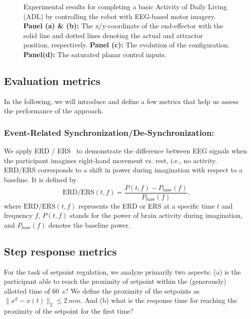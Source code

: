 \begin{figure}[htb]
    \caption{Experimental results for completing a basic Activity of Daily Living (ADL) by controlling the robot with EEG-based motor imagery. \textbf{Panel (a) \& (b):} The x/y-coordinate of the end-effector with the solid line and dotted lines denoting the actual and attractor position, respectively.
    \textbf{Panel (c):} The evolution of the configuration.
    \textbf{Panel(d):} The saturated planar control inputs. }\label{fig:braincontrol:experimental_results:adl_task:brain}
\end{figure}

\subsection{Evaluation metrics}
In the following, we will introduce and define a few metrics that help us assess the performance of the approach.

\subsubsection{Event-Related Synchronization/De-Synchronization:}
We apply \gls{ERD} / \gls{ERS}~\citep{pfurtscheller1999event} to demonstrate the difference between \gls{EEG} signals when the participant imagines right-hand movement vs. rest, i.e., no activity. \gls{ERD}/\gls{ERS} corresponds to a shift in power during imagination with respect to a baseline. It is defined by
\begin{equation}
    \mathrm{ERD/ERS}(t, f) = \frac{P(t, f) - P_{\mathrm{base}}(f)}{P_{\mathrm{base}}(f)},
\end{equation}
where $\mathrm{ERD/ERS}(t, f)$ represents the \gls{ERD} or \gls{ERS} at a specific time $t$ and frequency $f$, $P(t, f)$ stands for the power of brain activity during imagination, and $P_\mathrm{base}(f)$ denotes the baseline power. 

\subsection{Step response metrics}
For the task of setpoint regulation, we analyze primarily two aspects: (a) is the participant able to reach the proximity of setpoint within the (generously) allotted time of \SI{60}{s}? We define the proximity of the setpoints as $\lVert x^\mathrm{d} - x(t)\rVert_2 \leq \SI{2}{mm}$. And (b) what is the response time for reaching the proximity of the setpoint for the first time?